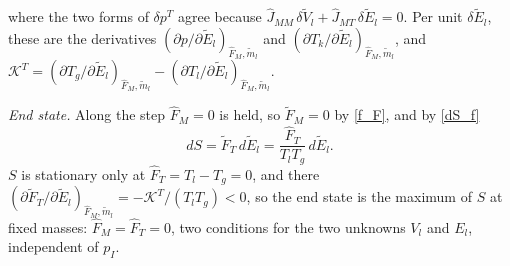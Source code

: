where the two forms of $\delta p^T$ agree because $\hat{J}_{MM}\,\delta\tilde{V}_l+\hat{J}_{MT}\,\delta\tilde{E}_l=0$. Per unit $\delta\tilde{E}_l$, these are the derivatives $(\partial p/\partial\tilde{E}_l)_{\hat{F}_M,\tilde{m}_l}$ and $(\partial T_k/\partial\tilde{E}_l)_{\hat{F}_M,\tilde{m}_l}$, and $\mathcal{K}^T=(\partial T_g/\partial\tilde{E}_l)_{\hat{F}_M,\tilde{m}_l}-(\partial T_l/\partial\tilde{E}_l)_{\hat{F}_M,\tilde{m}_l}$.

\emph{End state.} Along the step $\hat{F}_M=0$ is held, so $\tilde{F}_M=0$ by \eqref{f_F}, and by \eqref{dS_f}
\begin{equation}
dS=\tilde{F}_T\,d\tilde{E}_l=\frac{\hat{F}_T}{T_lT_g}\,d\tilde{E}_l .
\end{equation} $S$ is stationary only at $\hat{F}_T=T_l-T_g=0$, and there $(\partial\tilde{F}_T/\partial\tilde{E}_l)_{\hat{F}_M,\tilde{m}_l}=-\mathcal{K}^T/(T_lT_g)<0$, so the end state is the maximum of $S$ at fixed masses: $\hat{F}_M=\hat{F}_T=0$, two conditions for the two unknowns $V_l$ and $E_l$, independent of $p_I$.

